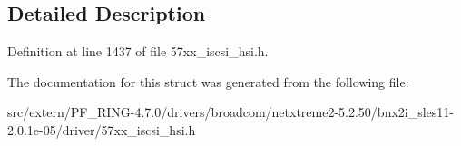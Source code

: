 \subsection{Detailed Description}


Definition at line 1437 of file 57xx\_\-iscsi\_\-hsi.h.



The documentation for this struct was generated from the following file:\begin{DoxyCompactItemize}
\item 
src/extern/PF\_\-RING-\/4.7.0/drivers/broadcom/netxtreme2-\/5.2.50/bnx2i\_\-sles11-\/2.0.1e-\/05/driver/57xx\_\-iscsi\_\-hsi.h\end{DoxyCompactItemize}
